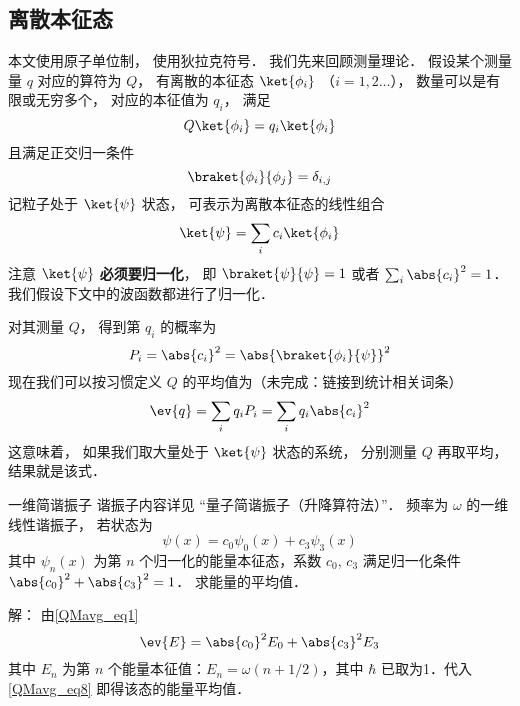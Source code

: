 
\begin{issues}
\issueTODO 
\end{issues}


\subsection{离散本征态}

本文使用原子单位制， 使用狄拉克符号． 我们先来回顾测量理论． 假设某个测量量 $q$ 对应的算符为 $Q$， 有离散的本征态 $\ket{\phi_i}$ （$i = 1,2\dots$）， 数量可以是有限或无穷多个， 对应的本征值为 $q_i$， 满足
\begin{equation}\label{QMavg_eq3}
Q\ket{\phi_i} = q_i \ket{\phi_i}
\end{equation}
且满足正交归一条件
\begin{equation}\label{QMavg_eq4}
\braket{\phi_i}{\phi_j} = \delta_{i,j}
\end{equation}
记粒子处于 $\ket{\psi}$ 状态， 可表示为离散本征态的线性组合
\begin{equation}\label{QMavg_eq2}
\ket{\psi} = \sum_i c_i \ket{\phi_i}
\end{equation}
注意 $\ket{\psi}$ \textbf{必须要归一化}， 即 $\braket{\psi}{\psi} = 1$ 或者 $\sum_i \abs{c_i}^2 = 1$． 我们假设下文中的波函数都进行了归一化．

对其测量 $Q$， 得到第 $q_i$ 的概率为
\begin{equation}
P_i = \abs{c_i}^2 = \abs{\braket{\phi_i}{\psi}}^2
\end{equation}
现在我们可以按习惯定义 $Q$ 的平均值为（未完成：链接到统计相关词条）
\begin{equation}\label{QMavg_eq1}
\ev{q} = \sum_i q_i P_i = \sum_i q_i \abs{c_i}^2
\end{equation}
这意味着， 如果我们取大量处于 $\ket{\psi}$ 状态的系统， 分别测量 $Q$ 再取平均， 结果就是该式．

\begin{example}{一维简谐振子}
谐振子内容详见 “量子简谐振子（升降算符法）”． 频率为 $\omega$ 的一维线性谐振子， 若状态为
\begin{equation}
\psi(x)=c_0 \psi_0(x)+c_3\psi_3(x)
\end{equation}
其中 $\psi_n(x)$ 为第 $n$ 个归一化的能量本征态，系数 $c_0$, $c_3$ 满足归一化条件 $\abs{c_0}^2+\abs{c_3}^2 = 1$． 求能量的平均值．

解： 由\autoref{QMavg_eq1}
\begin{equation}\label{QMavg_eq8}
\ev{E}=\abs{c_0}^2 E_0+\abs{c_3}^2 E_3
\end{equation}
其中 $E_n$ 为第 $n$ 个能量本征值：$E_n=\omega(n+1/2)$，其中 $\hbar$ 已取为1．代入\autoref{QMavg_eq8} 即得该态的能量平均值．
\end{example}

